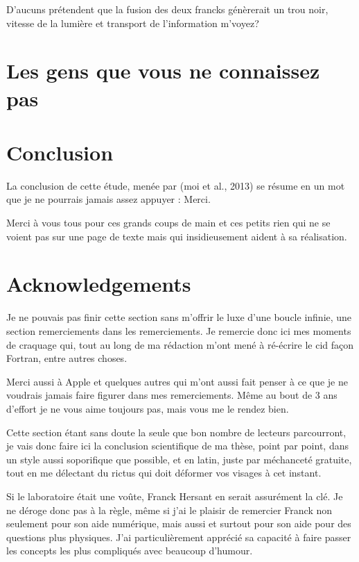 D'aucuns prétendent que la fusion des deux francks génèrerait un trou noir, vitesse de la lumière et transport de l'information m'voyez?

\section{Les gens que vous ne connaissez pas}

\section{Conclusion}
La conclusion de cette étude, menée par (moi et al., 2013) se résume en un mot que je ne pourrais jamais assez appuyer : Merci. 

Merci à vous tous pour ces grands coups de main et ces petits rien qui ne se voient pas sur une page de texte mais qui insidieusement aident à sa réalisation.

\section{Acknowledgements}
Je ne pouvais pas finir cette section sans m'offrir le luxe d'une boucle infinie, une section remerciements dans les remerciements. Je remercie donc ici mes moments de craquage qui, tout au long de ma rédaction m'ont mené à ré-écrire le cid façon Fortran, entre autres choses. 

Merci aussi à Apple et quelques autres qui m'ont aussi fait penser à ce que je ne voudrais jamais faire figurer dans mes remerciements. Même au bout de 3 ans d'effort je ne vous aime toujours pas, mais vous me le rendez bien. 


Cette section étant sans doute la seule que bon nombre de lecteurs parcourront, je vais donc faire ici la conclusion scientifique de ma thèse, point par point, dans un style aussi soporifique que possible, et en latin, juste par méchanceté gratuite, tout en me délectant du rictus qui doit déformer vos visages à cet instant. 




Si le laboratoire était une voûte, Franck Hersant en serait assurément la clé. Je ne déroge donc pas à la règle, même si j'ai le plaisir de remercier Franck non seulement pour son aide numérique, mais aussi et surtout pour son aide pour des questions plus physiques. J'ai particulièrement apprécié sa capacité à faire passer les concepts les plus compliqués avec beaucoup d'humour.


